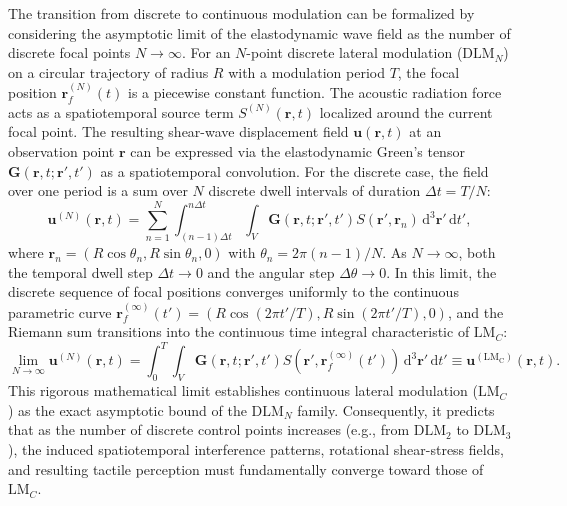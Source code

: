 \documentclass[pdflatex, sn-nature]{sn-jnl}
\theoremstyle{thmstyleone}%
\theoremstyle{thmstyletwo}%
\theoremstyle{thmstylethree}%
\begin{document}
The transition from discrete to continuous modulation can be formalized by considering the asymptotic limit of the elastodynamic wave field as the number of discrete focal points $N \to \infty$. For an $N$-point discrete lateral modulation ($\mathrm{DLM}_N$) on a circular trajectory of radius $R$ with a modulation period $T$, the focal position $\mathbf{r}_f^{(N)}(t)$ is a piecewise constant function. The acoustic radiation force acts as a spatiotemporal source term $S^{(N)}(\mathbf{r}, t)$ localized around the current focal point. The resulting shear-wave displacement field $\mathbf{u}(\mathbf{r}, t)$ at an observation point $\mathbf{r}$ can be expressed via the elastodynamic Green's tensor $\mathbf{G}(\mathbf{r}, t; \mathbf{r}', t')$ as a spatiotemporal convolution. For the discrete case, the field over one period is a sum over $N$ discrete dwell intervals of duration $\Delta t = T/N$:
\begin{equation}
    \mathbf{u}^{(N)}(\mathbf{r}, t) = \sum_{n=1}^{N} \int_{(n-1)\Delta t}^{n\Delta t} \int_{V} \mathbf{G}(\mathbf{r}, t; \mathbf{r}', t') S(\mathbf{r}', \mathbf{r}_n) \, \mathrm{d}^3\mathbf{r}' \, \mathrm{d}t',
\end{equation}
where $\mathbf{r}_n = (R\cos\theta_n, R\sin\theta_n, 0)$ with $\theta_n = 2\pi(n-1)/N$. As $N \to \infty$, both the temporal dwell step $\Delta t \to 0$ and the angular step $\Delta \theta \to 0$. In this limit, the discrete sequence of focal positions converges uniformly to the continuous parametric curve $\mathbf{r}_f^{(\infty)}(t') = (R\cos(2\pi t'/T), R\sin(2\pi t'/T), 0)$, and the Riemann sum transitions into the continuous time integral characteristic of $\mathrm{LM}_C$:
\begin{equation}
    \lim_{N \to \infty} \mathbf{u}^{(N)}(\mathbf{r}, t) = \int_{0}^{T} \int_{V} \mathbf{G}(\mathbf{r}, t; \mathbf{r}', t') S(\mathbf{r}', \mathbf{r}_f^{(\infty)}(t')) \, \mathrm{d}^3\mathbf{r}' \, \mathrm{d}t' \equiv \mathbf{u}^{(\mathrm{LM_C})}(\mathbf{r}, t).
\end{equation}
This rigorous mathematical limit establishes continuous lateral modulation ($\mathrm{LM}_C$) as the exact asymptotic bound of the $\mathrm{DLM}_N$ family. Consequently, it predicts that as the number of discrete control points increases (e.g., from $\mathrm{DLM}_2$ to $\mathrm{DLM}_3$), the induced spatiotemporal interference patterns, rotational shear-stress fields, and resulting tactile perception must fundamentally converge toward those of $\mathrm{LM}_C$.
\end{document}
